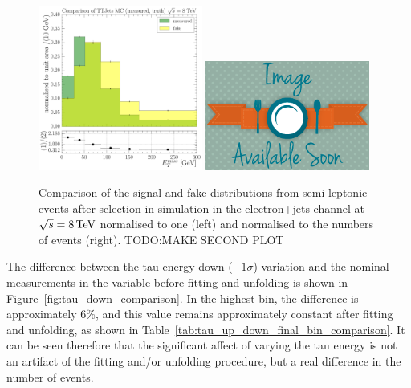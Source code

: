 \begin{figure}[hbtp]
    \centering
     \includegraphics[width=0.48\textwidth]{Chapters/04_Analysis/04b_XSections/images/tau_cross_checks/comparison_measured_fakeTTJets_normalised_to_one.pdf}\hfill
     \includegraphics[width=0.48\textwidth]{Chapters/04_Analysis/04b_XSections/images/placeholder.png}
	 \caption[]{Comparison of the signal and fake distributions from semi-leptonic \ttbar events after
     selection in simulation in the electron+jets channel at $\sqrt{s}=8\,\text{Te\hspace{-.08em}V}$ normalised to one (left) and
     normalised to the numbers of events (right). TODO:MAKE SECOND PLOT} %
     \label{fig:tau_shape_number_comparison}
\end{figure}

The difference between the tau energy down ($-1\sigma$) variation and the nominal measurements in the \met
variable before fitting and unfolding is shown in Figure~\ref{fig:tau_down_comparison}. In the highest \met
bin, the difference is approximately 6\%, and this value remains approximately constant after fitting and
unfolding, as shown in Table~\ref{tab:tau_up_down_final_bin_comparison}. It can be seen therefore that the
significant affect of varying the tau energy is not an artifact of the fitting and/or unfolding procedure, but
a real difference in the number of events.

